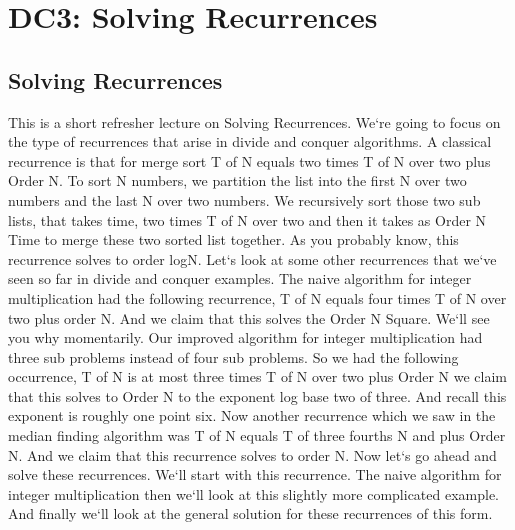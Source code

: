 \section{DC3: Solving Recurrences}

\subsection{Solving Recurrences}
This is a short refresher lecture on Solving Recurrences.
We`re going to focus on the type of recurrences that arise in divide and conquer algorithms.
A classical recurrence is that for merge sort T of N equals two times T of N over two plus Order N\@.
To sort N numbers, we partition the list into the first N over two numbers and the last N over two numbers.
We recursively sort those two sub lists, that takes time, two times T of N over two and then it takes as Order N Time to merge these two sorted list together.
As you probably know, this recurrence solves to order logN\@.
Let`s look at some other recurrences that we`ve seen so far in divide and conquer examples.
The naive algorithm for integer multiplication had the following recurrence, T of N equals four times T of N over two plus order N\@.
And we claim that this solves the Order N Square.
We`ll see you why momentarily.
Our improved algorithm for integer multiplication had three sub problems instead of four sub problems.
So we had the following occurrence, T of N is at most three times T of N over two plus Order N we claim that this solves to Order N to the exponent log base two of three.
And recall this exponent is roughly one point six.
Now another recurrence which we saw in the median finding algorithm was T of N equals T of three fourths N and plus Order N\@.
And we claim that this recurrence solves to order N\@.
Now let`s go ahead and solve these recurrences.
We`ll start with this recurrence.
The naive algorithm for integer multiplication then we`ll look at this slightly more complicated example.
And finally we`ll look at the general solution for these recurrences of this form.

